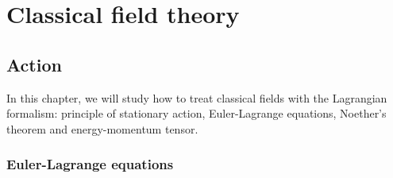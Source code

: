 \part{Classical field theory}

\chapter{Action}

    In this chapter, we will study how to treat classical fields with the Lagrangian formalism: principle of stationary action, Euler-Lagrange equations, Noether's theorem and energy-momentum tensor.

\section{Euler-Lagrange equations}

